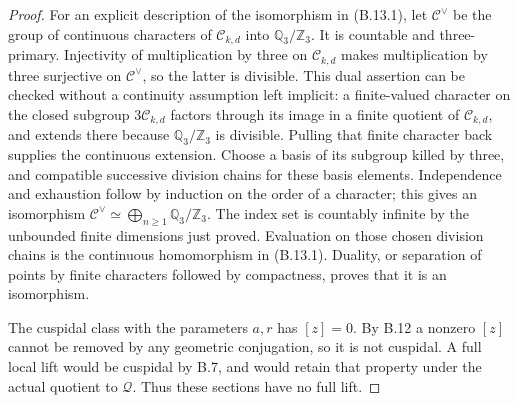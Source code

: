 \begin{proof}
For an explicit description of the isomorphism in
(B.13.1), let $\mathcal C^\vee$ be the group of
continuous characters of $\mathcal C_{k,d}$ into
$\mathbb Q_3/\mathbb Z_3$.
It is countable and three-primary.
Injectivity of multiplication by three on
$\mathcal C_{k,d}$ makes multiplication by three
surjective on $\mathcal C^\vee$, so the latter
is divisible. This dual assertion can be checked
without a continuity assumption left implicit:
a finite-valued character on the closed subgroup
$3\mathcal C_{k,d}$ factors through its image in
a finite quotient of $\mathcal C_{k,d}$, and extends
there because $\mathbb Q_3/\mathbb Z_3$ is divisible.
Pulling that finite character back supplies the
continuous extension.
Choose a basis of its subgroup killed by three,
and compatible successive division chains for
these basis elements. Independence and exhaustion
follow by induction on the order of a character;
this gives an isomorphism
$\mathcal C^\vee\simeq\bigoplus_{n\ge1}
 \mathbb Q_3/\mathbb Z_3$.
The index set is countably infinite by the
unbounded finite dimensions just proved.
Evaluation on those chosen division chains is
the continuous homomorphism in (B.13.1).
Duality, or separation of points by finite
characters followed by compactness, proves
that it is an isomorphism.

The cuspidal class with the parameters $a,r$
has $[z]=0$. By B.12 a nonzero $[z]$ cannot
be removed by any geometric conjugation, so
it is not cuspidal. A full local lift would be
cuspidal by B.7, and would retain that property
under the actual quotient to $\mathscr Q$.
Thus these sections have no full lift.
\end{proof}


